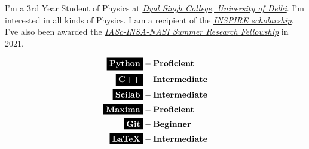 \documentclass[9pt]{developercv} %
\begin{document}
\vspace{0.5cm}



\begin{minipage}[t]{0.4\textwidth} %
	\vspace{-\baselineskip} %
	
	I’m a 3rd Year Student of Physics at \textit{{\href{http://dsc.du.ac.in/}{Dyal Singh College, University of Delhi}}}. I’m interested in all kinds of Physics. I am a recipient of the \textit{{\href{https://online-inspire.gov.in/}{INSPIRE scholarship}}}. I’ve also been awarded the \textit{{\href{https://web-japps.ias.ac.in:8443/SEP/SummerFellowships.jsp}{IASc-INSA-NASI Summer Research Fellowship}}} in 2021.
\end{minipage}
\hfill %
\begin{minipage}[t]{0.5\textwidth} %
	\vspace{-\baselineskip} %
	\begin{align*}
	\noir{Python} &- \textbf{Proficient} \\
	\noir{C++} &- \textbf{Intermediate} \\
	\noir{Scilab} &- \textbf{Intermediate} \\
	\noir{Maxima} &- \textbf{Proficient} \\
	\noir{Git} &- \textbf{Beginner} \\
	\noir{LaTeX} &- \textbf{Intermediate} 
	\end{align*}
\end{minipage}

\end{document}
